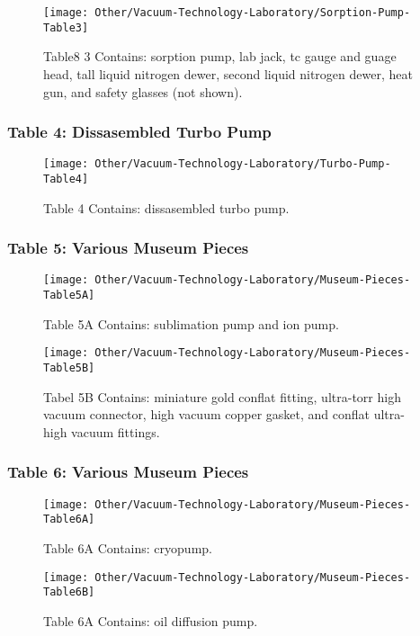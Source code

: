 \documentclass{book}
\begin{document}
\begin{figure}[H]
\texttt{[image: Other/Vacuum-Technology-Laboratory/Sorption-Pump-Table3]}
\caption[align=left]{Table8 3 Contains: sorption pump, lab jack, tc gauge and guage head, tall liquid nitrogen dewer, second liquid nitrogen dewer, heat gun, and safety glasses (not shown).}
\end{figure}

\subsubsection{Table 4: Dissasembled Turbo Pump}

\begin{figure}[H]
\texttt{[image: Other/Vacuum-Technology-Laboratory/Turbo-Pump-Table4]}
\caption[align=left]{Table 4 Contains: dissasembled turbo pump.}
\end{figure}

\subsubsection{Table 5: Various Museum Pieces}

\begin{figure}[H]
\texttt{[image: Other/Vacuum-Technology-Laboratory/Museum-Pieces-Table5A]}
\caption[align=left]{Table 5A Contains: sublimation pump and ion pump.}
\end{figure}


\begin{figure}[H]
\texttt{[image: Other/Vacuum-Technology-Laboratory/Museum-Pieces-Table5B]}
\caption{Tabel 5B Contains: miniature gold conflat fitting, ultra-torr high vacuum connector, high vacuum copper gasket, and conflat ultra-high vacuum fittings.}
\end{figure}

\subsubsection{Table 6: Various Museum Pieces}

\begin{figure}[H]
\texttt{[image: Other/Vacuum-Technology-Laboratory/Museum-Pieces-Table6A]}
\caption[align=left]{Table 6A Contains: cryopump.}
\end{figure}

\begin{figure}[H]
\texttt{[image: Other/Vacuum-Technology-Laboratory/Museum-Pieces-Table6B]}
\caption[align=left]{Table 6A Contains: oil diffusion pump.}
\end{figure}
\end{document}
